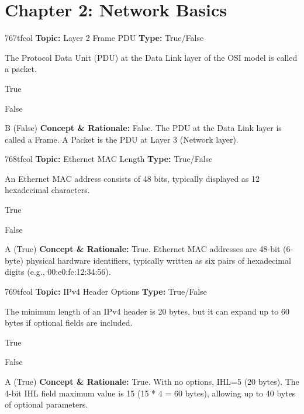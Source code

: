 \section{Chapter 2: Network Basics}

\begin{qcard}{767}{tfcol}
\textcolor{darkslate!75}{\small\textbf{Topic:} Layer 2 Frame PDU \hfill \textbf{Type:} True/False}\vspace{0.4em}\par
The Protocol Data Unit (PDU) at the Data Link layer of the OSI model is called a packet.
\begin{qoptions}
\item True
\item False
\end{qoptions}
\end{qcard}
\nopagebreak
\begin{explainbox}{B (False)}
\textbf{Concept \& Rationale:} False. The PDU at the Data Link layer is called a Frame. A Packet is the PDU at Layer 3 (Network layer).
\end{explainbox}

\begin{qcard}{768}{tfcol}
\textcolor{darkslate!75}{\small\textbf{Topic:} Ethernet MAC Length \hfill \textbf{Type:} True/False}\vspace{0.4em}\par
An Ethernet MAC address consists of 48 bits, typically displayed as 12 hexadecimal characters.
\begin{qoptions}
\item True
\item False
\end{qoptions}
\end{qcard}
\nopagebreak
\begin{explainbox}{A (True)}
\textbf{Concept \& Rationale:} True. Ethernet MAC addresses are 48-bit (6-byte) physical hardware identifiers, typically written as six pairs of hexadecimal digits (e.g., 00:e0:fc:12:34:56).
\end{explainbox}

\begin{qcard}{769}{tfcol}
\textcolor{darkslate!75}{\small\textbf{Topic:} IPv4 Header Options \hfill \textbf{Type:} True/False}\vspace{0.4em}\par
The minimum length of an IPv4 header is 20 bytes, but it can expand up to 60 bytes if optional fields are included.
\begin{qoptions}
\item True
\item False
\end{qoptions}
\end{qcard}
\nopagebreak
\begin{explainbox}{A (True)}
\textbf{Concept \& Rationale:} True. With no options, IHL=5 (20 bytes). The 4-bit IHL field maximum value is 15 (15 * 4 = 60 bytes), allowing up to 40 bytes of optional parameters.
\end{explainbox}

